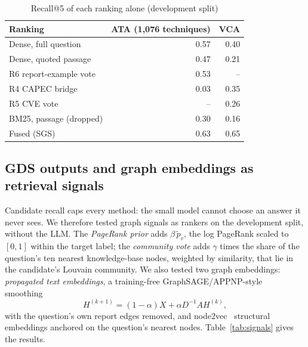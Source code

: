 \documentclass[conference]{IEEEtran}
\begin{document}
\begin{table}[t]
\caption{Recall@5 of each ranking alone (development split)}
\label{tab:components}
\centering
\footnotesize
\begin{tabular}{@{}l r r@{}}
\toprule
Ranking & ATA (1,076 techniques) & VCA \\
\midrule
Dense, full question & 0.57 & 0.40 \\
Dense, quoted passage & 0.47 & 0.21 \\
R6 report-example vote & 0.53 & -- \\
R4 CAPEC bridge & 0.03 & 0.35 \\
R5 CVE vote & -- & 0.26 \\
BM25, passage (dropped) & 0.30 & 0.16 \\
\midrule
Fused (SGS) & 0.63 & 0.65 \\
\bottomrule
\end{tabular}
\end{table}

\subsection{GDS outputs and graph embeddings as retrieval signals}

Candidate recall caps every method: the small model cannot choose an answer it never sees. We therefore tested graph signals as rankers on the development split, without the LLM. The \emph{PageRank prior} adds $\beta\,\tilde p_v$, the log PageRank scaled to $[0,1]$ within the target label; the \emph{community vote} adds $\gamma$ times the share of the question's ten nearest knowledge-base nodes, weighted by similarity, that lie in the candidate's Louvain community. We also tested two graph embeddings: \emph{propagated text embeddings}, a training-free GraphSAGE/APPNP-style smoothing~\cite{hamilton2017graphsage,gasteiger2019appnp}
\begin{equation}
H^{(k+1)} = (1-\alpha)X + \alpha D^{-1}AH^{(k)},
\end{equation}
with the question's own report edges removed, and node2vec~\cite{grover2016node2vec} structural embeddings anchored on the question's nearest nodes. Table~\ref{tab:signals} gives the results.
\end{document}
